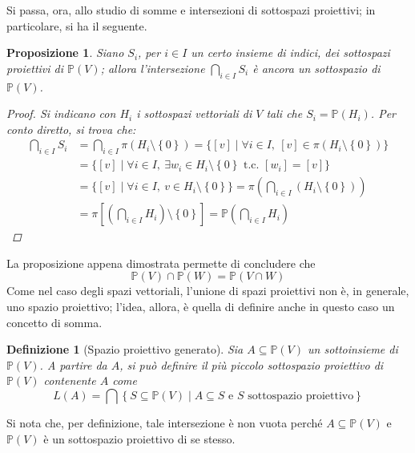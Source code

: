 \documentclass[11pt]{scrartcl}
\theoremstyle{style1}
\newtheorem{prop}{Proposizione}[section]
\newtheorem{definizione}{Definizione}[section]
\numberwithin{equation}{subsection}
\begin{document}
Si passa, ora, allo studio di somme e intersezioni di sottospazi proiettivi; in particolare, si ha il seguente.
\begin{prop}
	Siano $S_i$, per $i \in I$ un certo insieme di indici, dei sottospazi proiettivi di $\mathbb{P}(V)$; allora l'intersezione $\bigcap_{i \in I} S_i$ \`e ancora un sottospazio di $\mathbb{P}(V)$.
	\begin{proof}
		Si indicano con $H_i$ i sottospazi vettoriali di $V$ tali che $S_i = \mathbb{P}(H_i)$.
		Per conto diretto, si trova che:
		\[
		\begin{split}
			\bigcap_{i \in I} S_i &= \bigcap _{i\in I} \pi(H_i \setminus\left\{ 0 \right\} ) = \big\{[v]  \mid \forall i \in I, \ [v] \in \pi (H_i \setminus \left\{ 0 \right\} ) \big\}\\
					      &= \big\{[v]  \mid \forall i \in I, \ \exists w_i \in H_i \setminus\left\{ 0 \right\}\text{ t.c. } [w_i] = [v]\big\}\\
					      &=\big\{[v]  \mid \forall i \in I, \ v \in H_i \setminus\left\{ 0 \right\} \big\} = \pi \left(\bigcap_{i \in I} \left(H_i \setminus\left\{ 0 \right\}\right)  \right) \\
					      &= \pi \left[\left(\bigcap_{i \in I} H_i\right) \setminus\left\{ 0 \right\} \right] = \mathbb{P} \left(\bigcap_{i \in I} H_i\right) 
		\end{split}
		\] 
	\end{proof}
\end{prop}
\noindent La proposizione appena dimostrata permette di concludere che
\begin{equation}
	\mathbb{P}(V) \cap \mathbb{P}(W) = \mathbb{P}(V \cap W)
\end{equation}
Come nel caso degli spazi vettoriali, l'unione di spazi proiettivi non \`e, in generale, uno spazio proiettivo; l'idea, allora, \`e quella di definire anche in questo caso un concetto di somma.
\begin{definizione}
	[Spazio proiettivo generato]
	Sia $A \subseteq \mathbb{P}(V)$ un sottoinsieme di $\mathbb{P}(V)$.
	A partire da $A$, si pu\`o definire il pi\`u piccolo sottospazio proiettivo di $\mathbb{P}(V)$ contenente $A$ come
	\[
		L(A) = \bigcap \left\{ S \subseteq \mathbb{P}(V)  \mid A\subseteq S \text{ e } S \text{ sottospazio proiettivo} \right\} 
	\]
\end{definizione}
\noindent Si nota che, per definizione, tale intersezione \`e non vuota perch\'e $A \subseteq \mathbb{P}(V)$ e $\mathbb{P}(V)$ \`e un sottospazio proiettivo di se stesso.
\end{document}
